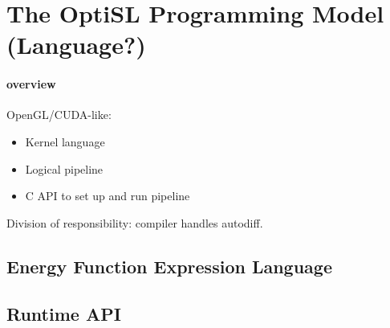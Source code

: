 \section{The OptiSL Programming Model (Language?)}
\label{sec:language}

\paragraph{overview} 
OpenGL/CUDA-like:
\begin{itemize}
  \item Kernel language
  \item Logical pipeline
  \item C API to set up and run pipeline
\end{itemize}

Division of responsibility: compiler handles autodiff.

\subsection{Energy Function Expression Language} %
\label{sub:expression_language}


\subsection{Runtime API} %
\label{sub:runtime_api}

